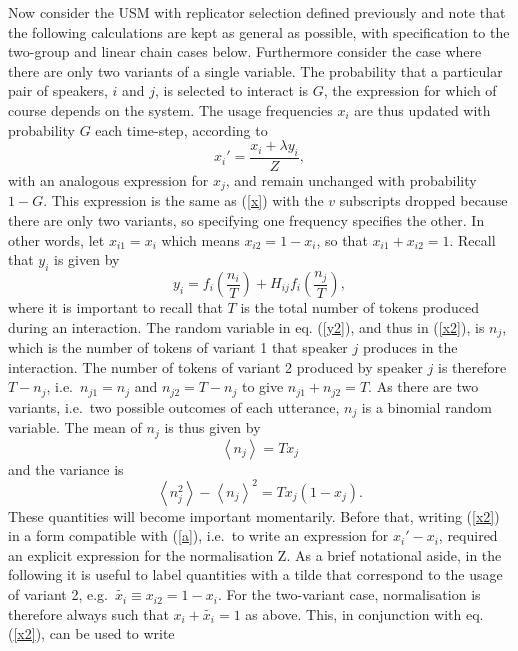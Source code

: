\documentclass[12pt]{article}
\begin{document}
Now consider the USM with replicator selection defined previously and note that the following calculations are kept as general as possible, with specification to the two-group and linear chain cases below. Furthermore consider the case where there are only two variants of a single variable. The probability that a particular pair of speakers, $i$ and $j$, is selected to interact is $G$, the expression for which of course depends on the system. The usage frequencies $x_i$ are thus updated with probability $G$ each time-step, according to 
\begin{equation}\label{x2}
x_i' = \frac{x_i + \lambda y_i}{Z},
\end{equation}
with an analogous expression for $x_j$, and remain unchanged with probability $1-G$. This expression is the same as (\ref{x}) with the $v$ subscripts dropped because there are only two variants, so specifying one frequency specifies the other. In other words, let $x_{i1} = x_{i}$ which means $x_{i2} = 1- x_{i}$, so that $ x_{i1} + x_{i2}=  1$. Recall that $y_i$ is given by
\begin{equation} \label{y2}
y_i = f_i\left(\frac{n_i}{T}\right) + H_{ij}f_i\left(\frac{n_j}{T}\right),
\end{equation}
where it is important to recall that $T$ is the total number of tokens produced during an interaction. The random variable in eq. (\ref{y2}), and thus in (\ref{x2}), is $n_{j}$, which is the number of tokens of variant 1 that speaker $j$ produces in the interaction. The number of tokens of variant 2 produced by speaker $j$ is therefore $T-n_j$, i.e.\ $n_{j1} = n_j$ and $n_{j2} = T - n_{j}$ to give $n_{j1} + n_{j2} = T$.  As there are two variants, i.e.\ two possible outcomes of each utterance, $n_j$ is a binomial random variable. The mean of $n_j$ is thus given by
\begin{equation}\label{mean}
\left\langle n_j \right\rangle = T x_j
\end{equation}
and the variance is
\begin{equation}\label{variance}
\left\langle n_j^2 \right\rangle - \left\langle n_j \right\rangle^2 = T x_j (1 - x_j).
\end{equation}
These quantities will become important momentarily. Before that, writing (\ref{x2}) in a form compatible with (\ref{a}), i.e.\ to write an expression for $x_i' - x_i$, required an explicit expression for the normalisation Z. As a brief notational aside, in the following it is useful to label quantities with a tilde that correspond to the usage of variant 2, e.g.\ $\tilde{x_i} \equiv x_{i2} = 1 - x_i$. For the two-variant case, normalisation is therefore always such that $x_i + \tilde{x_i} = 1$ as above. This, in conjunction with eq. (\ref{x2}), can be used to write
\end{document}
